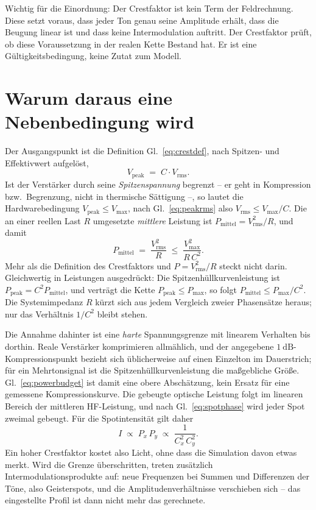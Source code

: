 \documentclass[11pt,a4paper]{article}
\newcommand{\crest}{\ensuremath{C}}
\begin{document}
Wichtig für die Einordnung: Der Crestfaktor ist kein Term der Feldrechnung.
Diese setzt voraus, dass jeder Ton genau seine Amplitude erhält, dass die
Beugung linear ist und dass keine Intermodulation auftritt. Der Crestfaktor
prüft, ob diese Voraussetzung in der realen Kette Bestand hat. Er ist eine
Gültigkeitsbedingung, keine Zutat zum Modell.

\section{Warum daraus eine Nebenbedingung wird}

Der Ausgangspunkt ist die Definition Gl.~\eqref{eq:crestdef}, nach Spitzen-
und Effektivwert aufgelöst,
\begin{equation}
  V_\mathrm{peak} \;=\; \crest \cdot V_\mathrm{rms} .
  \label{eq:peakrms}
\end{equation}
Ist der Verstärker durch seine \emph{Spitzenspannung} begrenzt -- er geht in
Kompression bzw.\ Begrenzung, nicht in thermische Sättigung --, so lautet die
Hardwarebedingung $V_\mathrm{peak}\le V_{\max}$, nach
Gl.~\eqref{eq:peakrms} also $V_\mathrm{rms}\le V_{\max}/\crest$. Die an einer
reellen Last $R$ umgesetzte \emph{mittlere} Leistung ist
$P_\mathrm{mittel}=V_\mathrm{rms}^2/R$, und damit
\begin{equation}
  P_\mathrm{mittel} \;=\; \frac{V_\mathrm{rms}^{2}}{R}
  \;\le\; \frac{V_{\max}^2}{R\,\crest^{2}} .
  \label{eq:powerbudget}
\end{equation}
Mehr als die Definition des Crestfaktors und $P=V_\mathrm{rms}^2/R$ steckt
nicht darin. Gleichwertig in Leistungen ausgedrückt: Die
Spitzenhüllkurvenleistung ist $P_\mathrm{peak}=\crest^{2}P_\mathrm{mittel}$,
und verträgt die Kette $P_\mathrm{peak}\le P_\mathrm{max}$, so folgt
$P_\mathrm{mittel}\le P_\mathrm{max}/\crest^{2}$. Die Systemimpedanz $R$
kürzt sich aus jedem Vergleich zweier Phasensätze heraus; nur das Verhältnis
$1/\crest^{2}$ bleibt stehen.

Die Annahme dahinter ist eine \emph{harte} Spannungsgrenze mit linearem
Verhalten bis dorthin. Reale Verstärker komprimieren allmählich, und der
angegebene $\SI{1}{\deci\bel}$-Kompressionspunkt bezieht sich üblicherweise
auf einen Einzelton im Dauerstrich; für ein Mehrtonsignal ist die
Spitzenhüllkurvenleistung die maßgebliche Größe. Gl.~\eqref{eq:powerbudget}
ist damit eine obere Abschätzung, kein Ersatz für eine gemessene
Kompressionskurve.
Die gebeugte optische Leistung folgt im linearen Bereich der mittleren
HF-Leistung, und nach Gl.~\eqref{eq:spotphase} wird jeder Spot zweimal
gebeugt. Für die Spotintensität gilt daher
\begin{equation}
  I \;\propto\; P_x\,P_y \;\propto\; \frac{1}{\crest_x^{2}\,\crest_y^{2}} .
  \label{eq:intensity}
\end{equation}
Ein hoher Crestfaktor kostet also Licht, ohne dass die Simulation davon etwas
merkt. Wird die Grenze überschritten, treten zusätzlich
Intermodulationsprodukte auf: neue Frequenzen bei Summen und Differenzen der
Töne, also Geisterspots, und die Amplitudenverhältnisse verschieben sich --
das eingestellte Profil ist dann nicht mehr das gerechnete.
\end{document}
